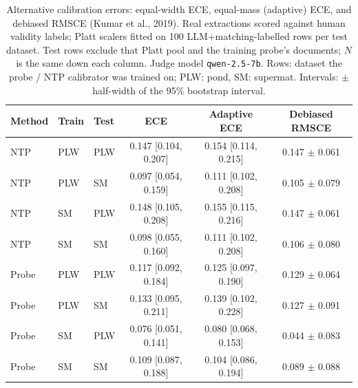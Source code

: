 \begin{table}[t]
\centering
\small
\caption{Alternative calibration errors: equal-width ECE, equal-mass (adaptive) ECE, and debiased RMSCE (Kumar et al., 2019). Real extractions scored against human validity labels; Platt scalers fitted on 100 LLM+matching-labelled rows per test dataset. Test rows exclude that Platt pool and the training probe's documents; $N$ is the same down each column. Judge model \texttt{qwen-2.5-7b}. Rows: dataset the probe / NTP calibrator was trained on; PLW: pond, SM: supermat. Intervals: $\pm$ half-width of the 95\% bootstrap interval.}
\label{tab:calibration-validated-real-ece-variants}
\begin{tabular}{lllccc}
\toprule
Method & Train & Test & ECE & Adaptive ECE & Debiased RMSCE \\
\midrule
NTP & PLW & PLW & 0.147 [0.104, 0.207] & 0.154 [0.114, 0.215] & 0.147 $\pm$ 0.061 \\
NTP & PLW & SM & 0.097 [0.054, 0.159] & 0.111 [0.102, 0.208] & 0.105 $\pm$ 0.079 \\
NTP & SM & PLW & 0.148 [0.105, 0.208] & 0.155 [0.115, 0.216] & 0.147 $\pm$ 0.061 \\
NTP & SM & SM & 0.098 [0.055, 0.160] & 0.111 [0.102, 0.208] & 0.106 $\pm$ 0.080 \\
\midrule
Probe & PLW & PLW & 0.117 [0.092, 0.184] & 0.125 [0.097, 0.190] & 0.129 $\pm$ 0.064 \\
Probe & PLW & SM & 0.133 [0.095, 0.211] & 0.139 [0.102, 0.228] & 0.127 $\pm$ 0.091 \\
Probe & SM & PLW & 0.076 [0.051, 0.141] & 0.080 [0.068, 0.153] & 0.044 $\pm$ 0.083 \\
Probe & SM & SM & 0.109 [0.087, 0.188] & 0.104 [0.086, 0.194] & 0.089 $\pm$ 0.088 \\
\bottomrule
\end{tabular}
\end{table}
